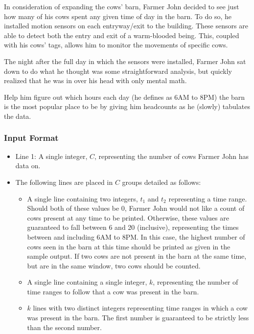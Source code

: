 In consideration of expanding the cows' barn, Farmer John decided to see just how many of his cows spent any given time of day in the barn.
To do so, he installed motion sensors on each entryway/exit to the building.
These sensors are able to detect both the entry and exit of a warm-blooded being.
This, coupled with his cows' tags, allows him to monitor the movements of specific cows.

The night after the full day in which the sensors were installed, Farmer John sat down to do what he thought was some straightforward analysis, but quickly realized that he was in over his head with only mental math.

Help him figure out which hours each day (he defines as 6AM to 8PM) the barn is the most popular place to be by giving him headcounts as he (slowly) tabulates the data.

\subsubsection{Input Format}

\begin{itemize}
    \item Line 1: A single integer, $C$, representing the number of cows Farmer John has data on.

    \item The following lines are placed in $C$ groups detailed as follows:
    \begin{itemize}
        \item A single line containing two integers, $t_1$ and $t_2$ representing a time range.
        Should both of these values be 0, Farmer John would not like a count of cows present at any time to be printed.
        Otherwise, these values are guaranteed to fall between 6 and 20 (inclusive), representing the times between and including 6AM to 8PM.
        In this case, the highest number of cows seen in the barn at this time should be printed as given in the sample output.
        If two cows are not present in the barn at the same time, but are in the same window, two cows should be counted.

        \item A single line containing a single integer, $k$, representing the number of time ranges to follow that a cow was present in the barn.

        \item $k$ lines with two distinct integers representing time ranges in which a cow was present in the barn.
        The first number is guaranteed to be strictly less than the second number.
    \end{itemize}
\end{itemize}

